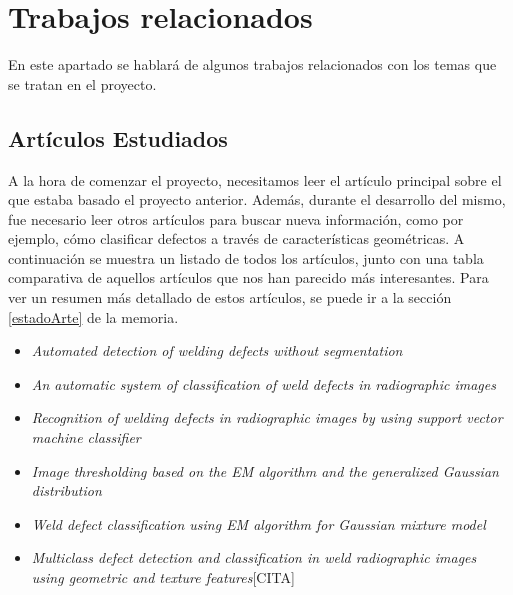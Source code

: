 \chapter{Trabajos relacionados}

En este apartado se hablará de algunos trabajos relacionados con los temas que se tratan en el proyecto.

\section{Artículos Estudiados}
A la hora de comenzar el proyecto, necesitamos leer el artículo principal sobre el que estaba basado el proyecto anterior. Además, durante el desarrollo del mismo, fue necesario leer otros artículos para buscar nueva información, como por ejemplo, cómo clasificar defectos a través de características geométricas. A continuación se muestra un listado de todos los artículos, junto con una tabla comparativa  de aquellos artículos que nos han parecido más interesantes. Para ver un resumen más detallado de estos artículos, se puede ir a la sección \ref{estadoArte} de la memoria. 

\begin{itemize}
		\item\textit{Automated detection of welding defects without segmentation} \cite{DomingoMery}
		\item \textit{An automatic system of classification of weld defects in radiographic images} \cite{vilar2009automatic}
		\item \textit{Recognition of welding defects in radiographic images by using support vector machine classifier} \cite{wang2010recognition}
		\item \textit{Image thresholding based on the EM algorithm and the generalized Gaussian distribution} \cite{bazi2007image}
		\item \textit{Weld defect classification using EM algorithm for Gaussian mixture model} \cite{Tridi}
		\item \textit{Multiclass defect detection and classification in weld radiographic images
using geometric and texture features}[CITA]
	\end{itemize}



